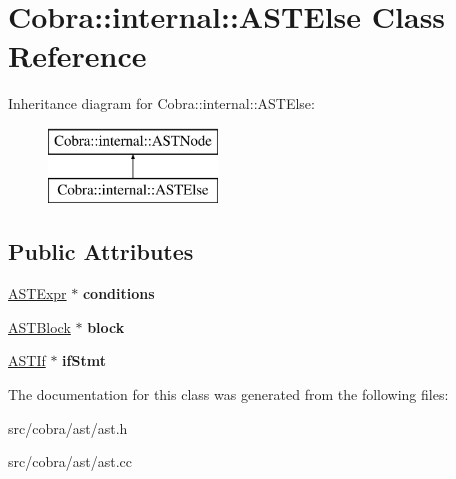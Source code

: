 \hypertarget{class_cobra_1_1internal_1_1_a_s_t_else}{\section{Cobra\+:\+:internal\+:\+:A\+S\+T\+Else Class Reference}
\label{class_cobra_1_1internal_1_1_a_s_t_else}
}
Inheritance diagram for Cobra\+:\+:internal\+:\+:A\+S\+T\+Else\+:\begin{figure}[H]
\begin{center}
\leavevmode
\includegraphics[height=2.000000cm]{class_cobra_1_1internal_1_1_a_s_t_else}
\end{center}
\end{figure}
\subsection*{Public Attributes}
\begin{DoxyCompactItemize}
\item 
\hypertarget{class_cobra_1_1internal_1_1_a_s_t_else_a6dbc7cd7172739f57de42510cfc261ca}{\hyperlink{class_cobra_1_1internal_1_1_a_s_t_expr}{A\+S\+T\+Expr} $\ast$ {\bfseries conditions}}\label{class_cobra_1_1internal_1_1_a_s_t_else_a6dbc7cd7172739f57de42510cfc261ca}

\item 
\hypertarget{class_cobra_1_1internal_1_1_a_s_t_else_a7353693c92ca38e5bef78ee483db681a}{\hyperlink{class_cobra_1_1internal_1_1_a_s_t_block}{A\+S\+T\+Block} $\ast$ {\bfseries block}}\label{class_cobra_1_1internal_1_1_a_s_t_else_a7353693c92ca38e5bef78ee483db681a}

\item 
\hypertarget{class_cobra_1_1internal_1_1_a_s_t_else_a61d07a78a5462b42d89428825cd7f168}{\hyperlink{class_cobra_1_1internal_1_1_a_s_t_if}{A\+S\+T\+If} $\ast$ {\bfseries if\+Stmt}}\label{class_cobra_1_1internal_1_1_a_s_t_else_a61d07a78a5462b42d89428825cd7f168}

\end{DoxyCompactItemize}


The documentation for this class was generated from the following files\+:\begin{DoxyCompactItemize}
\item 
src/cobra/ast/ast.\+h\item 
src/cobra/ast/ast.\+cc\end{DoxyCompactItemize}

